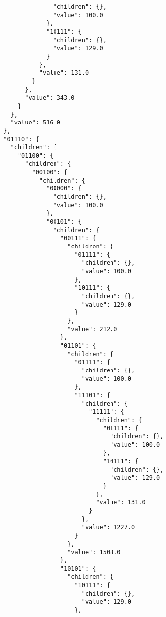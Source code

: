 \documentclass{article}
\begin{document}
\begin{listing}
\begin{verbatim}
                      "children": {},
                      "value": 100.0
                    },
                    "10111": {
                      "children": {},
                      "value": 129.0
                    }
                  },
                  "value": 131.0
                }
              },
              "value": 343.0
            }
          },
          "value": 516.0
        },
        "01110": {
          "children": {
            "01100": {
              "children": {
                "00100": {
                  "children": {
                    "00000": {
                      "children": {},
                      "value": 100.0
                    },
                    "00101": {
                      "children": {
                        "00111": {
                          "children": {
                            "01111": {
                              "children": {},
                              "value": 100.0
                            },
                            "10111": {
                              "children": {},
                              "value": 129.0
                            }
                          },
                          "value": 212.0
                        },
                        "01101": {
                          "children": {
                            "01111": {
                              "children": {},
                              "value": 100.0
                            },
                            "11101": {
                              "children": {
                                "11111": {
                                  "children": {
                                    "01111": {
                                      "children": {},
                                      "value": 100.0
                                    },
                                    "10111": {
                                      "children": {},
                                      "value": 129.0
                                    }
                                  },
                                  "value": 131.0
                                }
                              },
                              "value": 1227.0
                            }
                          },
                          "value": 1508.0
                        },
                        "10101": {
                          "children": {
                            "10111": {
                              "children": {},
                              "value": 129.0
                            },

\end{verbatim}
\end{listing}
\end{document}
